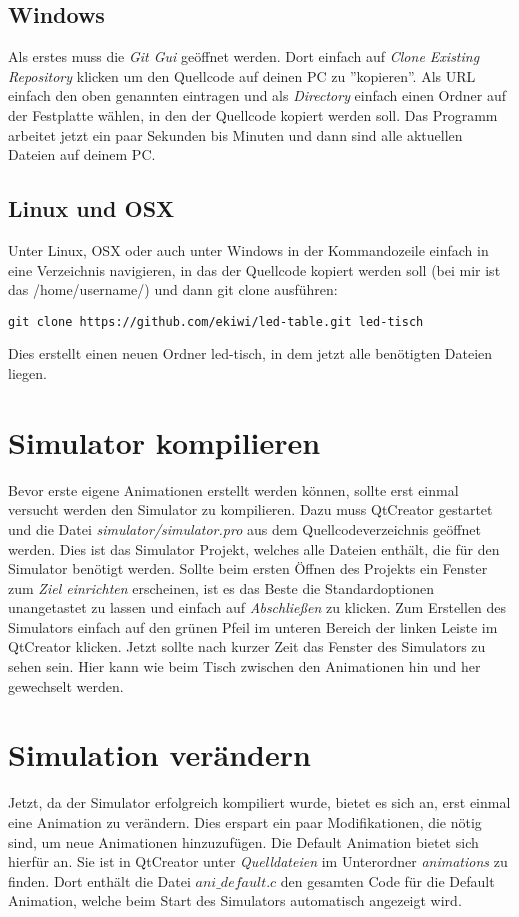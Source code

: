 \documentclass[10pt,a4paper]{article}
\begin{document}
\subsection{Windows}
Als erstes muss die \textit{Git Gui} geöffnet werden. Dort einfach auf \textit{Clone Existing Repository} klicken um den Quellcode auf deinen PC zu ''kopieren''.
Als URL einfach den oben genannten eintragen und als \textit{Directory} einfach einen Ordner auf der Festplatte wählen, in den der Quellcode kopiert werden soll.
Das Programm arbeitet jetzt ein paar Sekunden bis Minuten und dann sind alle aktuellen Dateien auf deinem PC.

\subsection{Linux und OSX}
Unter Linux, OSX oder auch unter Windows in der Kommandozeile einfach in eine Verzeichnis navigieren, in das der Quellcode kopiert werden soll (bei mir ist das /home/username/) und dann git clone ausführen:
\begin{lstlisting}
git clone https://github.com/ekiwi/led-table.git led-tisch
\end{lstlisting}
Dies erstellt einen neuen Ordner led-tisch, in dem jetzt alle benötigten Dateien liegen.

\section{Simulator kompilieren}
Bevor erste eigene Animationen erstellt werden können, sollte erst einmal versucht werden den Simulator zu kompilieren.
Dazu muss QtCreator gestartet und die Datei \textit{simulator/simulator.pro} aus dem Quellcodeverzeichnis geöffnet werden.
Dies ist das Simulator Projekt, welches alle Dateien enthält, die für den Simulator benötigt werden.
Sollte beim ersten Öffnen des Projekts ein Fenster zum \textit{Ziel einrichten} erscheinen, ist es das Beste die Standardoptionen unangetastet zu lassen und einfach auf \textit{Abschließen} zu klicken.
Zum Erstellen des Simulators einfach auf den grünen Pfeil im unteren Bereich der linken Leiste im QtCreator klicken. Jetzt sollte nach kurzer Zeit das Fenster des Simulators zu sehen sein. Hier kann wie beim Tisch zwischen den Animationen hin und her gewechselt werden.

\lstset{language=C}

\section{Simulation verändern}
Jetzt, da der Simulator erfolgreich kompiliert wurde, bietet es sich an, erst einmal eine Animation zu verändern. Dies erspart ein paar Modifikationen, die nötig sind, um neue Animationen hinzuzufügen.
Die Default Animation bietet sich hierfür an. Sie ist in QtCreator unter \textit{Quelldateien} im Unterordner \textit{animations} zu finden. Dort enthält die Datei \textit{$ani\_default.c$} den gesamten Code für die Default Animation, welche beim Start des Simulators automatisch angezeigt wird.
\end{document}
